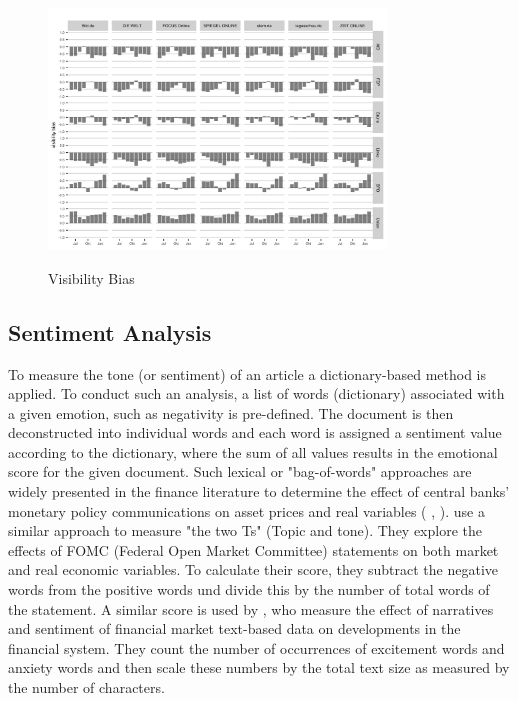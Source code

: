 \documentclass[12pt,a4paper,notitlepage]{article}
\begin{document}
\begin{figure}[H]
	\caption{Visibility Bias}
	\begin{center}
		\includegraphics[width=0.8\textwidth]{../figs/visibility_bias.png}
		\label{fig_visibility_bias}
	\end{center}
\end{figure}


\subsection{Sentiment Analysis}


To measure the tone (or sentiment) of an article a dictionary-based method is applied. To conduct such an analysis, a list of words (dictionary) associated with a given emotion, such as negativity is pre-defined. The document is then deconstructed into individual words and each word is assigned a sentiment value according to the dictionary, where the sum of all values results in the emotional score for the given document. Such lexical or "bag-of-words" approaches are widely presented in the finance literature to determine the effect of central banks' monetary policy communications on asset prices and real variables (\citet{nyman_news_2018} \citet{tetlock_giving_2007}, \citet{tetlock_more_2008}). \citet{hansen_shocking_2016} use a similar approach to measure "the two Ts" (Topic and tone). They explore the effects of FOMC (Federal Open Market Committee) statements on both market and real economic variables. To calculate their score, they subtract the negative words from the positive words und divide this by the number of total words of the statement. A similar score is used by \citet{nyman_news_2018}, who measure the effect of narratives and sentiment of financial market text-based data on developments in the financial system. They count the number of occurrences of excitement words and anxiety words and then scale these numbers by the total text size as measured by the number of characters.
\end{document}
